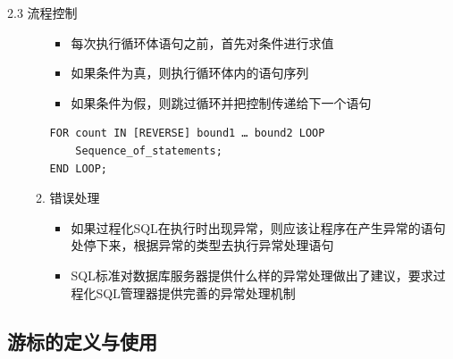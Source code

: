 \begin{frame}{2.3 流程控制}
\begin{itemize}
\begin{enumerate}
        \begin{itemize}
            \item 每次执行循环体语句之前，首先对条件进行求值
            \item 如果条件为真，则执行循环体内的语句序列
            \item 如果条件为假，则跳过循环并把控制传递给下一个语句
        \end{itemize}
\framebreak
\begin{block}{}
\begin{lstlisting}
FOR count IN [REVERSE] bound1 … bound2 LOOP
    Sequence_of_statements;
END LOOP;
\end{lstlisting}
\end{block} 

        \framebreak
        \item 错误处理 
        \begin{itemize}
            \item 如果过程化SQL在执行时出现异常，则应该让程序在产生异常的语句处停下来，根据异常的类型去执行异常处理语句 
            \item SQL标准对数据库服务器提供什么样的异常处理做出了建议，要求过程化SQL管理器提供完善的异常处理机制 
        \end{itemize}
    \end{enumerate}
\end{itemize}
\end{frame}



\subsection{游标的定义与使用}

